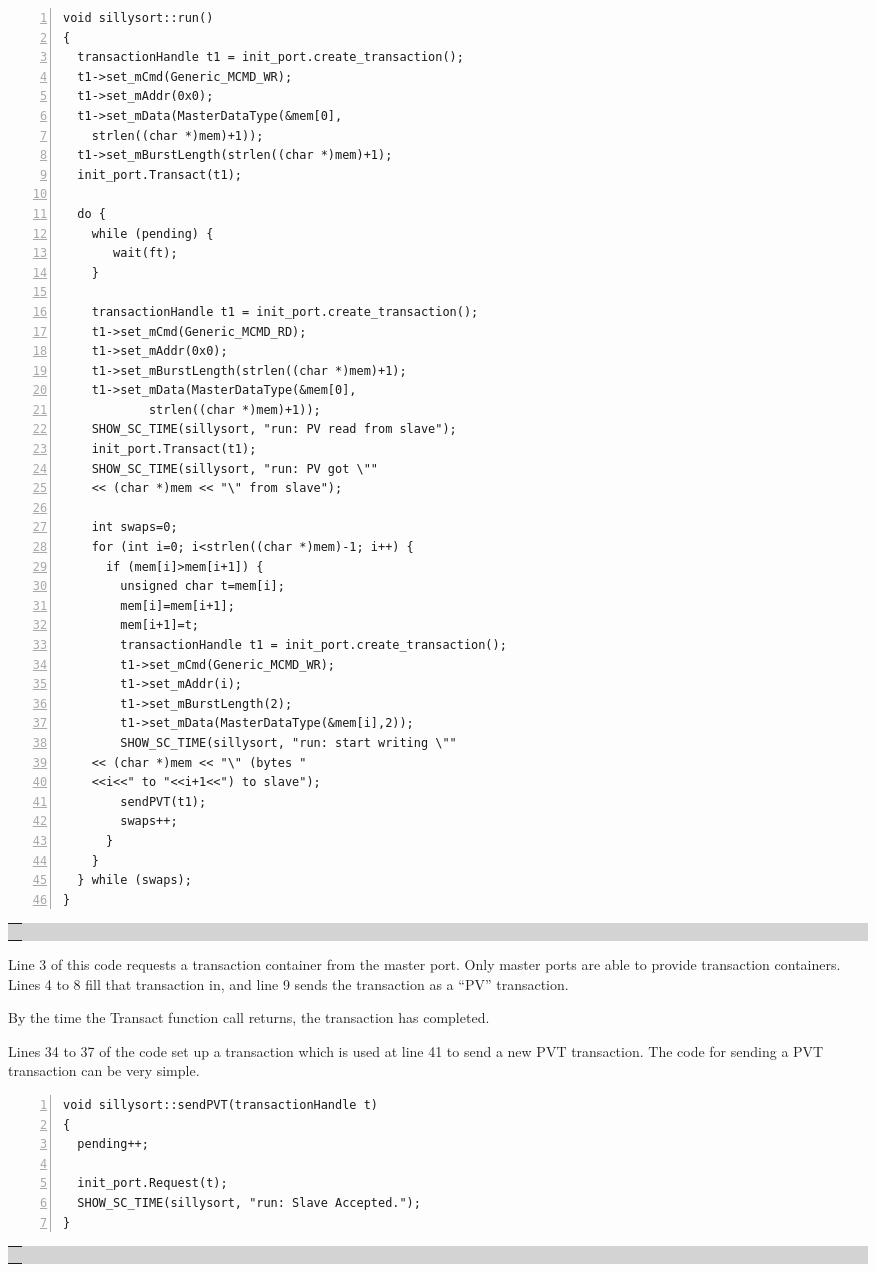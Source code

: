\documentclass[12pt,oneside]{gsbook}
\def\example#1{\begin{center}\colorbox{lightgrey}{\begin{tabular}{|p{0.6\paperwidth}|}\hline\\#1\\ \\ \hline\end{tabular}}\end{center}}
\newenvironment{exampleenv}{\begin{lrbox}{\examplebox}\begin{minipage}{0.6\paperwidth}}{\end{minipage}\end{lrbox}\example{\usebox{\examplebox}}}
\begin{document}
\begin{exampleenv}
\begin{Verbatim}[numbers=left,fontsize=\small]
void sillysort::run()
{
  transactionHandle t1 = init_port.create_transaction();
  t1->set_mCmd(Generic_MCMD_WR);
  t1->set_mAddr(0x0);
  t1->set_mData(MasterDataType(&mem[0],
	strlen((char *)mem)+1));
  t1->set_mBurstLength(strlen((char *)mem)+1);
  init_port.Transact(t1);
 
  do {
    while (pending) {
       wait(ft);
    }
    
    transactionHandle t1 = init_port.create_transaction();
    t1->set_mCmd(Generic_MCMD_RD);
    t1->set_mAddr(0x0);
    t1->set_mBurstLength(strlen((char *)mem)+1);
    t1->set_mData(MasterDataType(&mem[0],
			strlen((char *)mem)+1));
    SHOW_SC_TIME(sillysort, "run: PV read from slave");
    init_port.Transact(t1);
    SHOW_SC_TIME(sillysort, "run: PV got \"" 
	<< (char *)mem << "\" from slave");

    int swaps=0;
    for (int i=0; i<strlen((char *)mem)-1; i++) {
      if (mem[i]>mem[i+1]) {
        unsigned char t=mem[i];
        mem[i]=mem[i+1];
        mem[i+1]=t;
        transactionHandle t1 = init_port.create_transaction();
        t1->set_mCmd(Generic_MCMD_WR);
        t1->set_mAddr(i);
        t1->set_mBurstLength(2);
        t1->set_mData(MasterDataType(&mem[i],2));
        SHOW_SC_TIME(sillysort, "run: start writing \"" 
	<< (char *)mem << "\" (bytes "
	<<i<<" to "<<i+1<<") to slave");
        sendPVT(t1);
        swaps++;
      }
    }
  } while (swaps);
}
\end{Verbatim}
\end{exampleenv}

Line 3 of this code requests a transaction container from the master
port. Only master ports are able to provide transaction
containers. Lines 4 to 8 fill that transaction in, and line 9 sends
the transaction as a ``PV'' transaction.

By the time the Transact function call returns, the transaction has
completed.

Lines 34 to 37 of the code set up a transaction which is used at line
41 to send a new PVT transaction. The code for sending a PVT
transaction can be very simple.

\begin{exampleenv}
\begin{Verbatim}[numbers=left,fontsize=\small]
void sillysort::sendPVT(transactionHandle t)
{
  pending++;
  
  init_port.Request(t);
  SHOW_SC_TIME(sillysort, "run: Slave Accepted."); 
}
\end{Verbatim}
\end{exampleenv}
\end{document}
